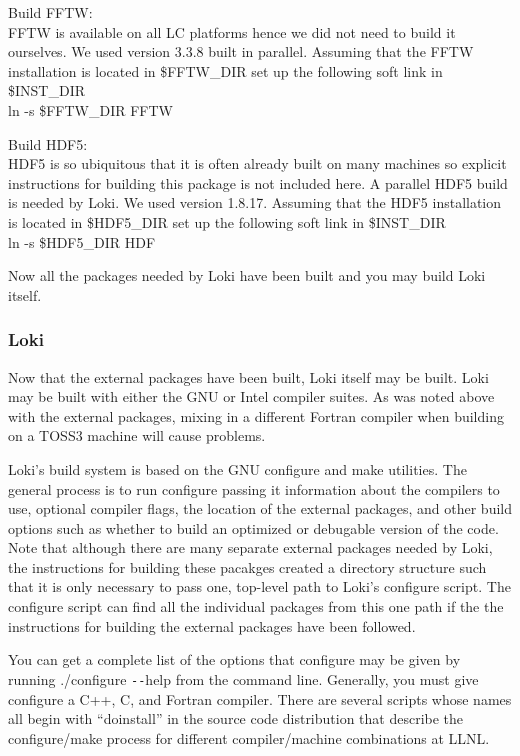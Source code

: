 \documentclass[11pt]{amsart}
\begin{document}
Build FFTW: \\
FFTW is available on all LC platforms hence we did not need to build it
ourselves.  We used version 3.3.8 built in parallel.  Assuming that the FFTW
installation is located in \$FFTW\_DIR set up the following soft link in
\$INST\_DIR \\
ln -s \$FFTW\_DIR FFTW

Build HDF5: \\
HDF5 is so ubiquitous that it is often already built on many machines so
explicit instructions for building this package is not included here. A
parallel HDF5 build is needed by Loki.  We used version 1.8.17.  Assuming that
the HDF5 installation is located in \$HDF5\_DIR set up the following soft link
in \$INST\_DIR \\
ln -s \$HDF5\_DIR HDF

Now all the packages needed by Loki have been built and you may build Loki
itself.

\subsubsection*{Loki}
Now that the external packages have been built, Loki itself may be built.  Loki
may be built with either the GNU or Intel compiler suites.  As was noted above
with the external packages, mixing in a different Fortran compiler when
building on a TOSS3 machine will cause problems.

Loki's build system is based on the GNU configure and make utilities.  The
general process is to run configure passing it information about the compilers
to use, optional compiler flags, the location of the external packages, and
other build options such as whether to build an optimized or debugable version
of the code.  Note that although there are many separate external packages
needed by Loki, the instructions for building these pacakges created a
directory structure such that it is only necessary to pass one, top-level path
to Loki's configure script.  The configure script can find all the individual
packages from this one path if the the instructions for building the external
packages have been followed.

You can get a complete list of the options that configure may be given by
running ./configure \texttt{-{}-}help from the command line.  Generally, you
must give configure a C++, C, and Fortran compiler.  There are several scripts
whose names all  begin with ``doinstall'' in the source code distribution that
describe the configure/make process for different compiler/machine combinations
at LLNL.
\end{document}
